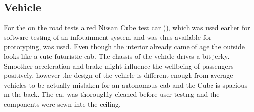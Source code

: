\subsection{Vehicle}
For the on the road tests a red Nissan Cube test car (), which was used earlier for software testing of an infotainment system and was thus available for prototyping, was used. Even though the interior already came of age the outside looks like a cute futuristic cab. The chassis of the vehicle drives a bit jerky. Smoother acceleration and brake might influence the wellbeing of passengers positively, however the design of the vehicle is different enough from average vehicles to be actually mistaken for an autonomous cab and the Cube is spacious in the back. The car was thoroughly cleaned before user testing and the components were sewn into the ceiling.

